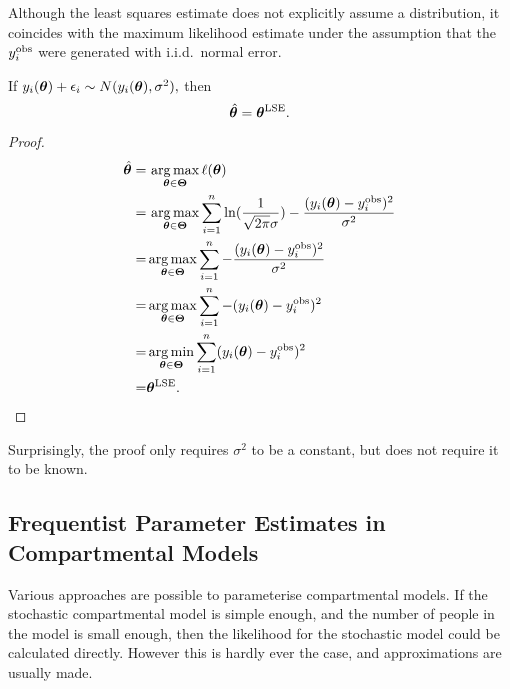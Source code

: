 Although the least squares estimate does not explicitly assume a distribution,
it coincides with the maximum likelihood estimate under the assumption that
the $y_i^{\mathrm{obs}}$ were generated with i.i.d.\ normal error.

\begin{theorem}\label{thm:LSE_normal}
    If $y_i(\bm{\theta}) + \epsilon_i \sim N(y_i(\bm{\theta}), \sigma^2),$ then
    $$
        \hat{\bm{\theta}} = \bm{\theta}^{\mathrm{LSE}}.
    $$
\end{theorem}

\begin{proof}
    \begin{align*}
        \hat{\bm{\theta}}
        = & \, \operatorname*{arg\,max}_{\bm{\theta}\in\mathbf{\Theta}}\ell(\bm{\theta}) \\
        = & \, \operatorname*{arg\,max}_{\bm{\theta}\in\mathbf{\Theta}}
        \sum_{i = 1}^n
        \ln(\frac{1}{\sqrt{2\pi}\sigma})
        -\frac{(y_i(\bm{\theta})- y_i^{\mathrm{obs}})^2}{\sigma^2}            \\
        = & \operatorname*{arg\,max}_{\bm{\theta}\in\mathbf{\Theta}} \sum_{i = 1}^n
        - \frac{(y_i(\bm{\theta})- y_i^{\mathrm{obs}})^2 }{\sigma^2}          \\
        = & \operatorname*{arg\,max}_{\bm{\theta}\in\mathbf{\Theta}} \sum_{i = 1}^n
        - (y_i(\bm{\theta})- y_i^{\mathrm{obs}})^2                            \\
        = & \operatorname*{arg\,min}_{\bm{\theta}\in\mathbf{\Theta}} \sum_{i = 1}^n
        (y_i(\bm{\theta})- y_i^{\mathrm{obs}})^2                              \\
        = & \bm{\theta}^{\mathrm{LSE}}.
    \end{align*}
\end{proof}

Surprisingly, the proof only requires $\sigma^2$ to be a constant, but does
not require it to be known.

\subsection*{Frequentist Parameter Estimates in Compartmental Models}

Various approaches are possible to parameterise compartmental models.
If the stochastic compartmental model is simple enough, and the number of
people in the model is small enough, then the likelihood
for the stochastic model could be calculated directly. However this is hardly
ever the case, and approximations are usually made.

